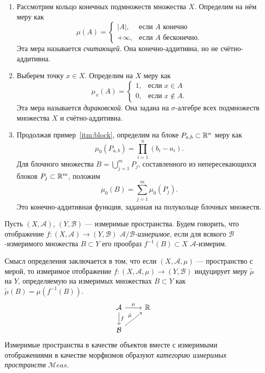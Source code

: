 \begin{enumerate}
	\item Рассмотрим кольцо конечных подмножеств множества $X$. Определим на нём меру как
		\begin{equation*}
			\mu(A)=\begin{cases}
					|A|, & \mbox{если } A\mbox{ конечно} \\
					+\infty, & \mbox{если } A\mbox{ бесконечно}.
				\end{cases}
		\end{equation*}
		Эта мера называется \textit{считающей}. Она конечно-аддитивна, но не счётно-аддитивна.
	\item Выберем точку $x\in X$. Определим на $X$ меру как
		\begin{equation*}
			\mu_x(A)=\begin{cases}
					1, & \mbox{если } x\in A\\
					0, & \mbox{если } x\not\in A.
				\end{cases}
		\end{equation*}
		Эта мера называется \textit{дираковской}. Она задана на $\sigma$-алгебре всех подмножеств множества $X$ и счётно-аддитивна.
	\item Продолжая пример~\ref{itm:block}, определим на блоке $P_{a,b}\subset\mathbb {R}^n$ меру как
		\begin{equation*}
			\mu_0(P_{a,b})=\prod_{i=1}^n (b_i-a_i).
		\end{equation*}
		Для блочного множества $B=\bigcup\limits_{j=1}^m P_j$, составленного из непересекающихся блоков $P_j\subset\mathbb {R}^m$, положим
		\begin{equation*}
			\mu_0(B)=\sum_{j=1}^m\mu_0(P_j).
		\end{equation*}
		Это конечно-аддитивная функция, заданная на полукольце блочных множеств.\\
\end{enumerate}
\begin{defin}
	Пусть $(X,\mathcal{A})$, $(Y,\mathcal{B})$ --- измеримые пространства. Будем говорить, что отображение $f\colon(X,\mathcal{A})\to(Y,\mathcal{B})$ \textit{$\mathcal{A}/\mathcal{B}$-измеримое}, если для всякого $\mathcal{B}$-измеримого множества $B\subset Y$ его прообраз $f^{-1}(B)\subset X$ $\mathcal{A}$-измерим. 
\end{defin}
Смысл определения заключается в том, что если $(X,\mathcal{A},\mu)$ --- пространство с мерой, то измеримое отображение $f\colon(X,\mathcal{A},\mu)\to(Y,\mathcal{B})$ индуцирует меру $\tilde{\mu}$ на $Y$, определяемую на измеримых множествах $B\subset Y$ как $\tilde{\mu}(B)=\mu(f^{-1}(B))$.
	\begin{equation*}
		\begin{tikzcd}
			\mathcal{A} \arrow{r}{\mu} \arrow{d}{f} & \RR \\
			\mathcal{B} \arrow{ru}{\tilde{\mu}} & 
		\end{tikzcd}
	\end{equation*}
Измеримые пространства в качестве объектов вместе с измеримыми отображениями в качестве морфизмов образуют \textit{категорию измеримых пространств} $\mathcal{M}eas$.

